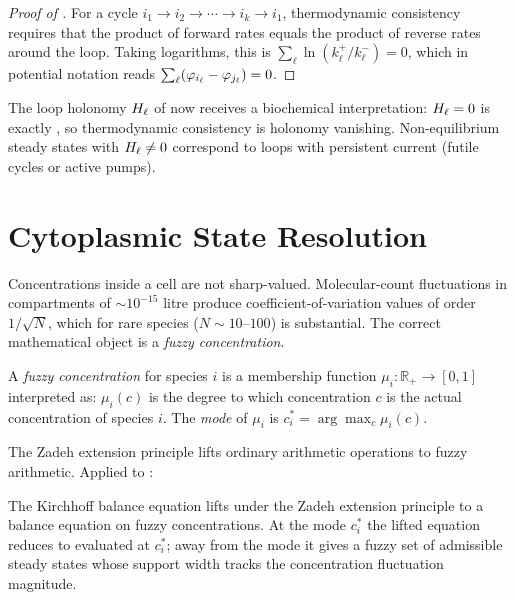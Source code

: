 \begin{proof}[Proof of ]
For a cycle $i_1\to i_2\to\cdots\to i_k\to i_1$, thermodynamic consistency
requires that the product of forward rates equals the product of reverse rates
around the loop.  Taking logarithms, this is
$\sum_\ell\ln(k_\ell^+/k_\ell^-)=0$, which in potential notation reads
$\sum_\ell(\varphi_{i_\ell}-\varphi_{j_\ell})=0$.
\end{proof}

The loop holonomy $H_\ell$ of  now receives a biochemical
interpretation: $H_\ell = 0$ is exactly , so thermodynamic
consistency is holonomy vanishing.  Non-equilibrium steady states with
$H_\ell \ne 0$ correspond to loops with persistent current (futile cycles or
active pumps).

\section{Cytoplasmic State Resolution}
\label{sec:cytoplasmic}

Concentrations inside a cell are not sharp-valued.  Molecular-count fluctuations
in compartments of $\sim 10^{-15}$ litre produce coefficient-of-variation values
of order $1/\!\sqrt{N}$, which for rare species ($N\sim 10$--$100$) is
substantial.  The correct mathematical object is a \emph{fuzzy concentration}.

\begin{definition}
\label{def:fuzzy-conc}
A \emph{fuzzy concentration} for species $i$ is a membership function
$\mu_i:\mathbb{R}_{+}\to[0,1]$ interpreted as: $\mu_i(c)$ is the degree to
which concentration $c$ is the actual concentration of species $i$.  The
\emph{mode} of $\mu_i$ is $c_i^* = \arg\max_c \mu_i(c)$.
\end{definition}

The Zadeh extension principle lifts ordinary arithmetic operations to fuzzy
arithmetic.  Applied to :

\begin{proposition}
\label{prop:fuzzy-kcl}
The Kirchhoff balance equation  lifts under the Zadeh extension
principle to a balance equation on fuzzy concentrations.  At the mode
$c_i^*$ the lifted equation reduces to  evaluated at $c_i^*$;
away from the mode it gives a fuzzy set of admissible steady states whose
support width tracks the concentration fluctuation magnitude.
\end{proposition}

